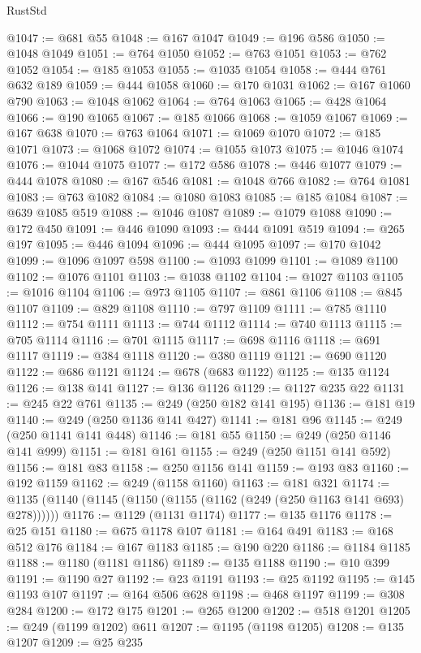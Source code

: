 \begin{lexlean}{RustStd}
\begin{coremodule}
@1047 := @681 @55
@1048 := @167 @1047
@1049 := @196 @586
@1050 := @1048 @1049
@1051 := @764 @1050
@1052 := @763 @1051
@1053 := @762 @1052
@1054 := @185 @1053
@1055 := @1035 @1054
@1058 := @444 @761 @632 @189
@1059 := @444 @1058
@1060 := @170 @1031
@1062 := @167 @1060 @790
@1063 := @1048 @1062
@1064 := @764 @1063
@1065 := @428 @1064
@1066 := @190 @1065
@1067 := @185 @1066
@1068 := @1059 @1067
@1069 := @167 @638
@1070 := @763 @1064
@1071 := @1069 @1070
@1072 := @185 @1071
@1073 := @1068 @1072
@1074 := @1055 @1073
@1075 := @1046 @1074
@1076 := @1044 @1075
@1077 := @172 @586
@1078 := @446 @1077
@1079 := @444 @1078
@1080 := @167 @546
@1081 := @1048 @766
@1082 := @764 @1081
@1083 := @763 @1082
@1084 := @1080 @1083
@1085 := @185 @1084
@1087 := @639 @1085 @519
@1088 := @1046 @1087
@1089 := @1079 @1088
@1090 := @172 @450
@1091 := @446 @1090
@1093 := @444 @1091 @519
@1094 := @265 @197
@1095 := @446 @1094
@1096 := @444 @1095
@1097 := @170 @1042
@1099 := @1096 @1097 @598
@1100 := @1093 @1099
@1101 := @1089 @1100
@1102 := @1076 @1101
@1103 := @1038 @1102
@1104 := @1027 @1103
@1105 := @1016 @1104
@1106 := @973 @1105
@1107 := @861 @1106
@1108 := @845 @1107
@1109 := @829 @1108
@1110 := @797 @1109
@1111 := @785 @1110
@1112 := @754 @1111
@1113 := @744 @1112
@1114 := @740 @1113
@1115 := @705 @1114
@1116 := @701 @1115
@1117 := @698 @1116
@1118 := @691 @1117
@1119 := @384 @1118
@1120 := @380 @1119
@1121 := @690 @1120
@1122 := @686 @1121
@1124 := @678 (@683 @1122)
@1125 := @135 @1124
@1126 := @138 @141
@1127 := @136 @1126
@1129 := @1127 @235 @22
@1131 := @245 @22 @761
@1135 := @249 (@250 @182 @141 @195)
@1136 := @181 @19
@1140 := @249 (@250 @1136 @141 @427)
@1141 := @181 @96
@1145 := @249 (@250 @1141 @141 @448)
@1146 := @181 @55
@1150 := @249 (@250 @1146 @141 @999)
@1151 := @181 @161
@1155 := @249 (@250 @1151 @141 @592)
@1156 := @181 @83
@1158 := @250 @1156 @141
@1159 := @193 @83
@1160 := @192 @1159
@1162 := @249 (@1158 @1160)
@1163 := @181 @321
@1174 := @1135 (@1140 (@1145 (@1150 (@1155 (@1162 (@249 (@250 @1163 @141 @693) @278))))))
@1176 := @1129 (@1131 @1174)
@1177 := @135 @1176
@1178 := @25 @151
@1180 := @675 @1178 @107
@1181 := @164 @491
@1183 := @168 @512 @176
@1184 := @167 @1183
@1185 := @190 @220
@1186 := @1184 @1185
@1188 := @1180 (@1181 @1186)
@1189 := @135 @1188
@1190 := @10 @399
@1191 := @1190 @27
@1192 := @23 @1191
@1193 := @25 @1192
@1195 := @145 @1193 @107
@1197 := @164 @506 @628
@1198 := @468 @1197
@1199 := @308 @284
@1200 := @172 @175
@1201 := @265 @1200
@1202 := @518 @1201
@1205 := @249 (@1199 @1202) @611
@1207 := @1195 (@1198 @1205)
@1208 := @135 @1207
@1209 := @25 @235

\end{coremodule}
\end{lexlean}
